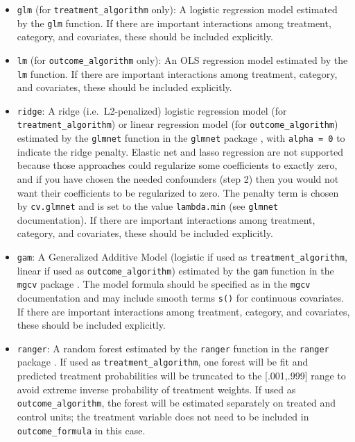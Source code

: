 \documentclass[
]{article}
\providecommand{\tightlist}{%
  \setlength{\itemsep}{0pt}\setlength{\parskip}{0pt}}
\begin{document}
\begin{itemize}
\tightlist
\item
  \texttt{glm} (for \texttt{treatment\_algorithm} only): A logistic regression model estimated by the \texttt{glm} function. If there are important interactions among treatment, category, and covariates, these should be included explicitly.
\item
  \texttt{lm} (for \texttt{outcome\_algorithm} only): An OLS regression model estimated by the \texttt{lm} function. If there are important interactions among treatment, category, and covariates, these should be included explicitly.
\item
  \texttt{ridge}: A ridge (i.e.~L2-penalized) logistic regression model (for \texttt{treatment\_algorithm}) or linear regression model (for \texttt{outcome\_algorithm}) estimated by the \texttt{glmnet} function in the \texttt{glmnet} package \citep{glmnet}, with \texttt{alpha\ =\ 0} to indicate the ridge penalty. Elastic net and lasso regression are not supported because those approaches could regularize some coefficients to exactly zero, and if you have chosen the needed confounders (step 2) then you would not want their coefficients to be regularized to zero. The penalty term is chosen by \texttt{cv.glmnet} and is set to the value \texttt{lambda.min} (see \texttt{glmnet} documentation). If there are important interactions among treatment, category, and covariates, these should be included explicitly.
\item
  \texttt{gam}: A Generalized Additive Model (logistic if used as \texttt{treatment\_algorithm}, linear if used as \texttt{outcome\_algorithm}) estimated by the \texttt{gam} function in the \texttt{mgcv} package \citep{mgcv}. The model formula should be specified as in the \texttt{mgcv} documentation and may include smooth terms \texttt{s()} for continuous covariates. If there are important interactions among treatment, category, and covariates, these should be included explicitly.
\item
  \texttt{ranger}: A random forest estimated by the \texttt{ranger} function in the \texttt{ranger} package \citep{ranger}. If used as \texttt{treatment\_algorithm}, one forest will be fit and predicted treatment probabilities will be truncated to the {[}.001,.999{]} range to avoid extreme inverse probability of treatment weights. If used as \texttt{outcome\_algorithm}, the forest will be estimated separately on treated and control units; the treatment variable does not need to be included in \texttt{outcome\_formula} in this case.
\end{itemize}
\end{document}
